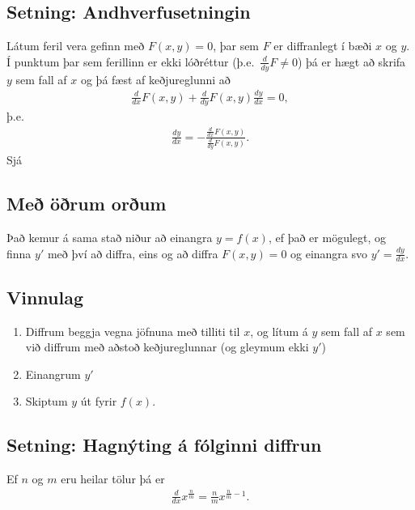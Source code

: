 \documentclass[a4paper,10pt,icelandic]{sphinxmanual}
\begin{document}
\subsection{Setning: Andhverfusetningin}
\label{\detokenize{kafli03:setning-andhverfusetningin}}
Látum feril vera gefinn með \(F(x,y) =0\), þar sem \(F\) er
diffranlegt í bæði \(x\) og \(y\). Í punktum þar sem ferillinn
er ekki lóðréttur (þ.e. \(\frac{d}{dy}F \neq 0\)) þá er hægt að
skrifa \(y\) sem fall af \(x\) og þá fæst af keðjureglunni að
\begin{equation*}
\begin{split}\frac{d}{dx} F(x,y) + \frac{d}{dy}F(x,y) \frac{dy}{dx} = 0,\end{split}
\end{equation*}
þ.e.
\begin{equation*}
\begin{split}\frac{dy}{dx} = -\frac{\frac{d}{dx} F(x,y)}{\frac{d}{dy} F(x,y)}.\end{split}
\end{equation*}
Sjá 


\subsection{Með öðrum orðum}
\label{\detokenize{kafli03:me-orum-orum}}
Það kemur á sama stað niður að einangra \(y=f(x)\), ef það er
mögulegt, og finna \(y'\) með því að diffra, eins og að diffra
\(F(x,y)=0\) og einangra svo \(y'=\frac{dy}{dx}\).


\subsection{Vinnulag}
\label{\detokenize{kafli03:vinnulag}}\begin{enumerate}
\item {} 
Diffrum beggja vegna jöfnuna með tilliti til \(x\), og lítum á
\(y\) sem fall af \(x\) sem við diffrum með aðstoð
keðjureglunnar (og gleymum ekki \(y'\))

\item {} 
Einangrum \(y'\)

\item {} 
Skiptum \(y\) út fyrir \(f(x)\).

\end{enumerate}


\subsection{Setning: Hagnýting á fólginni diffrun}
\label{\detokenize{kafli03:setning-hagnyting-a-folginni-diffrun}}
Ef \(n\) og \(m\) eru heilar tölur þá er
\begin{equation*}
\begin{split}\frac{d}{dx} x^{\frac nm} = \frac nm x^{\frac nm -1}.\end{split}
\end{equation*}
\end{document}
